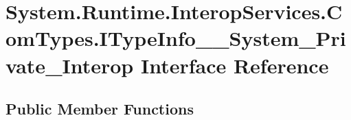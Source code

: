 \hypertarget{interface_system_1_1_runtime_1_1_interop_services_1_1_com_types_1_1_i_type_info_____system___private___interop}{}\section{System.\+Runtime.\+Interop\+Services.\+Com\+Types.\+I\+Type\+Info\+\_\+\+\_\+\+System\+\_\+\+Private\+\_\+\+Interop Interface Reference}
\label{interface_system_1_1_runtime_1_1_interop_services_1_1_com_types_1_1_i_type_info_____system___private___interop}
\subsection*{Public Member Functions}
